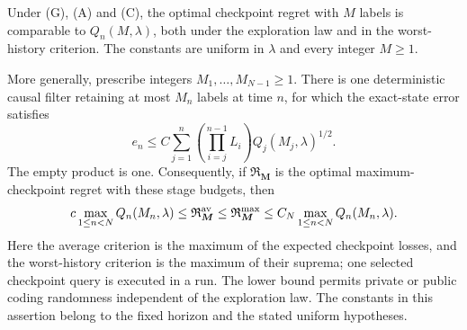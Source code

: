 \begin{theorem}
\label{thm:causal-transfer}
Under \textup{(G)}, \textup{(A)} and \textup{(C)}, the optimal
checkpoint regret with $M$ labels is comparable to $Q_n(M,\lambda)$,
both under the exploration law and in the worst-history criterion.
The constants are uniform in $\lambda$ and every integer $M\ge1$.

More generally, prescribe integers $M_1,\ldots,M_{N-1}\ge1$.
There is one deterministic causal filter retaining at most $M_n$ labels
at time $n$, for which the exact-state error satisfies
\begin{equation}\label{eq:transfer-recurrence}
 e_n\le C\sum_{j=1}^n
    \left(\prod_{i=j}^{n-1}L_i\right)
                     Q_j(M_j,\lambda)^{1/2}.
\end{equation}
The empty product is one. Consequently, if $\mathfrak R_{\boldsymbol M}$
is the optimal maximum-checkpoint regret with these stage budgets, then
\begin{equation}\label{eq:transfer-causal-law}
 c\max_{1\le n<N}Q_n(M_n,\lambda)
 \le\mathfrak R_{\boldsymbol M}^{\rm av}
 \le\mathfrak R_{\boldsymbol M}^{\rm max}
 \le C_N\max_{1\le n<N}Q_n(M_n,\lambda).
\end{equation}
Here the average criterion is the maximum of the expected checkpoint
losses, and the worst-history criterion is the maximum of their suprema;
one selected checkpoint query is executed in a run.
The lower bound permits private or public coding randomness independent
of the exploration law. The constants in this assertion belong to the
fixed horizon and the stated uniform hypotheses.
\end{theorem}
